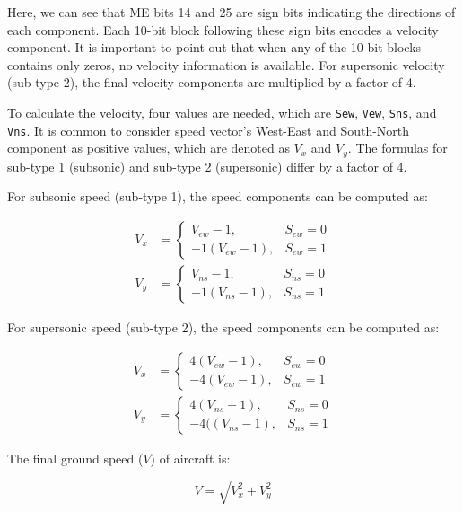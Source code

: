 Here, we can see that ME bits 14 and 25 are sign bits indicating the directions of each component. Each 10-bit block following these sign bits encodes a velocity component. It is important to point out that when any of the 10-bit blocks contains only zeros, no velocity information is available. For supersonic velocity (sub-type 2), the final velocity components are multiplied by a factor of 4.

To calculate the velocity, four values are needed, which are \texttt{Sew}, \texttt{Vew},  \texttt{Sns}, and \texttt{Vns}. It is common to consider speed vector's West-East and South-North component as positive values, which are denoted as $V_x$ and $V_y$. The formulas for sub-type 1 (subsonic) and sub-type 2 (supersonic) differ by a factor of 4.

For subsonic speed (sub-type 1), the speed components can be computed as:

\begin{align}
  V_x &= 
  \begin{cases}
    V_{ew} - 1, & S_{ew} = 0 \\
    -1(V_{ew} - 1), & S_{ew} = 1
  \end{cases}
 \\
  V_y &= 
  \begin{cases}
    V_{ns} - 1, & S_{ns} = 0 \\
    -1(V_{ns} - 1), & S_{ns} = 1
  \end{cases}
\end{align}

For supersonic speed (sub-type 2), the speed components can be computed as:

\begin{align}
  V_x &= 
  \begin{cases}
    4(V_{ew} - 1), & S_{ew} = 0 \\
    -4(V_{ew} - 1), & S_{ew} = 1
  \end{cases}
 \\
  V_y &= 
  \begin{cases}
    4(V_{ns} - 1), & S_{ns} = 0 \\
    -4((V_{ns} - 1), & S_{ns} = 1
  \end{cases}
\end{align}

The final ground speed ($V$) of aircraft is:

\begin{equation}
  V = \sqrt{V_x^2 + V_y^2}
\end{equation}


